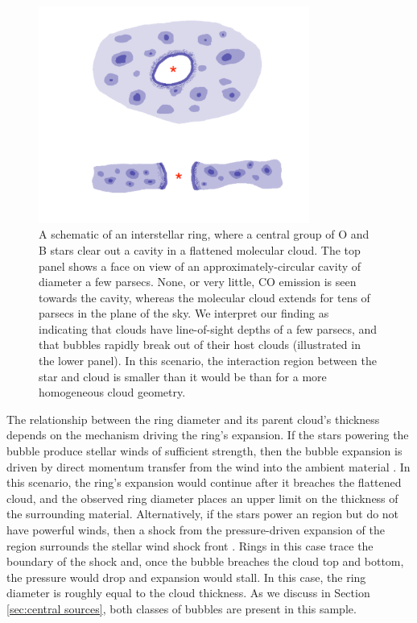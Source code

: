 \begin{figure}
\includegraphics[width=3.5in]{bubble_schematic}
\caption{A schematic of an interstellar ring, where a central group of O and B stars clear out a cavity in a flattened molecular cloud.
The top panel shows a face on view of an approximately-circular cavity of diameter a few parsecs. None, or very little, CO emission
is seen towards the cavity, whereas the molecular cloud extends for tens of parsecs in the plane of the sky. We interpret our finding
as indicating that clouds have line-of-sight depths of a few parsecs, and that bubbles rapidly break out of their host clouds
(illustrated in the lower panel).
In this scenario, the interaction region between the star and cloud is smaller than it would be than for a more homogeneous cloud geometry.
}
\label{fig:schematic_ch2_bubbles}
\end{figure}


The relationship between the ring diameter and its parent cloud's thickness depends on
the mechanism driving the ring's expansion. If the stars powering the bubble produce
stellar winds of sufficient strength, then the bubble expansion is driven by direct momentum
transfer from the wind into the ambient material \citep{Castor75}. In this scenario, the ring's expansion would continue after
it breaches the flattened cloud, and the observed ring diameter places an upper limit
on the thickness of the surrounding material. Alternatively, if the stars power an \hii region
but do not have powerful winds, then a shock from the pressure-driven expansion of the \hii region surrounds the
stellar wind shock front \citep{Freyer03}.  Rings in this case trace the boundary of the \hii shock and, once the bubble
breaches the cloud top and bottom, the pressure would drop and expansion would stall. In this
case, the ring diameter is roughly equal to the cloud thickness. As we discuss in Section \ref{sec:central sources},
both classes of bubbles are present in this sample.

